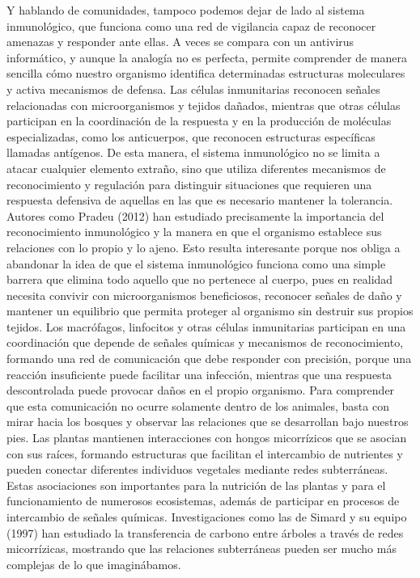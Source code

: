 \documentclass[12pt]{article}
\begin{document}
Y hablando de comunidades, tampoco podemos dejar de lado al sistema inmunológico, que funciona como una red de vigilancia capaz de reconocer amenazas y responder ante ellas. A veces se compara con un antivirus informático, y aunque la analogía no es perfecta, permite comprender de manera sencilla cómo nuestro organismo identifica determinadas estructuras moleculares y activa mecanismos de defensa. Las células inmunitarias reconocen señales relacionadas con microorganismos y tejidos dañados, mientras que otras células participan en la coordinación de la respuesta y en la producción de moléculas especializadas, como los anticuerpos, que reconocen estructuras específicas llamadas antígenos. De esta manera, el sistema inmunológico no se limita a atacar cualquier elemento extraño, sino que utiliza diferentes mecanismos de reconocimiento y regulación para distinguir situaciones que requieren una respuesta defensiva de aquellas en las que es necesario mantener la tolerancia.
Autores como Pradeu (2012) han estudiado precisamente la importancia del reconocimiento inmunológico y la manera en que el organismo establece sus relaciones con lo propio y lo ajeno. Esto resulta interesante porque nos obliga a abandonar la idea de que el sistema inmunológico funciona como una simple barrera que elimina todo aquello que no pertenece al cuerpo, pues en realidad necesita convivir con microorganismos beneficiosos, reconocer señales de daño y mantener un equilibrio que permita proteger al organismo sin destruir sus propios tejidos. Los macrófagos, linfocitos y otras células inmunitarias participan en una coordinación que depende de señales químicas y mecanismos de reconocimiento, formando una red de comunicación que debe responder con precisión, porque una reacción insuficiente puede facilitar una infección, mientras que una respuesta descontrolada puede provocar daños en el propio organismo.
Para comprender que esta comunicación no ocurre solamente dentro de los animales, basta con mirar hacia los bosques y observar las relaciones que se desarrollan bajo nuestros pies. Las plantas mantienen interacciones con hongos micorrízicos que se asocian con sus raíces, formando estructuras que facilitan el intercambio de nutrientes y pueden conectar diferentes individuos vegetales mediante redes subterráneas. Estas asociaciones son importantes para la nutrición de las plantas y para el funcionamiento de numerosos ecosistemas, además de participar en procesos de intercambio de señales químicas. Investigaciones como las de Simard y su equipo (1997) han estudiado la transferencia de carbono entre árboles a través de redes micorrízicas, mostrando que las relaciones subterráneas pueden ser mucho más complejas de lo que imaginábamos.
\end{document}
